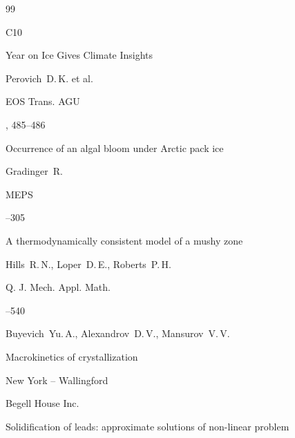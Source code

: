 \begin{thebibliography}{99}


\issue C10






\paper Year on Ice Gives Climate Insights

\by Perovich~D.\,K. et al.

\jour EOS Trans. AGU




, 485--486






\paper Occurrence of an algal bloom under Arctic pack ice 

\by Gradinger~R.

\jour MEPS



--305




\paper A thermodynamically consistent model of a mushy zone

\by Hills~R.\,N., Loper~D.\,E., Roberts~P.\,H.

\jour Q. J. Mech. Appl. Math.




--540




\by Buyevich~Yu.\,A., Alexandrov~D.\,V., Mansurov~V.\,V.

\book Macrokinetics of crystallization

\publaddr New York – Wallingford

\publ Begell House Inc.








\paper Solidification of leads: approximate solutions of non-linear problem


\end{thebibliography}
